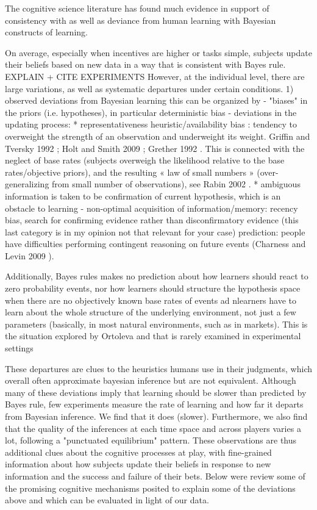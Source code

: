 The cognitive science literature has found much evidence in support of consistency with as well as deviance from human learning with Bayesian constructs of learning. 

On average, especially when incentives are higher or tasks simple, subjects update their beliefs based on new data in a way that is consistent with Bayes rule. EXPLAIN + CITE EXPERIMENTS
However, at the individual level, there are large variations, as well as systematic departures under certain conditions. 
1) observed deviations from Bayesian learning
this can be organized by 
- "biases" in the priors (i.e. hypotheses), in particular deterministic bias
- deviations in the updating process: 
* representativeness heuristic/availability bias : tendency to overweight the strength of an observation and underweight its weight. Griffin and Tversky 1992 \cite{griffin1992weighing}; Holt and Smith 2009 \cite{holt2009update} ; Grether 1992 \cite{grether1992testing}. This is connected with the neglect of base rates (subjects overweigh the likelihood relative to the base rates/objective priors), and the resulting « law of small numbers » (over-generalizing from small number of observations), see Rabin 2002 \cite{rabin2002perspective}.
* ambiguous information is taken to be confirmation of current hypothesis, which is an obstacle to learning
- non-optimal acquisition of information/memory: recency bias, search for confirming evidence rather than disconfirmatory evidence (this last category is in my opinion not that relevant for your case)
prediction: people have difficulties performing contingent reasoning on future events (Charness and Levin 2009 \cite{charness2009origin}).

Additionally, Bayes rules makes no prediction about how learners should react to zero probability events, nor how learners should structure the hypothesis space when there are no objectively known base rates of events ad nlearners have to learn about the whole structure of the underlying environment, not just a few parameters (basically, in most natural environments, such as in markets). This is the situation explored by Ortoleva \cite{ortoleva2012modeling} and that is rarely examined in experimental settings 

These departures are clues to the heuristics humans use in their judgments, which overall often approximate bayesian inference but are not equivalent. 
Although many of these deviations imply that learning should be slower than predicted by Bayes rule,  few experiments measure the rate of learning and how far it departs from Bayesian inference. We find that it does (slower). Furthermore, we also find that the quality of the inferences at each time space and across players varies a lot, following a "punctuated equilibrium" pattern. These observations are thus additional clues about the cognitive processes at play, with fine-grained information about how subjects update their beliefs in response to new information and the success and failure of their bets. Below were review some of the promising cognitive mechanisms posited to explain some of the deviations above and which can be evaluated in light of our data.

